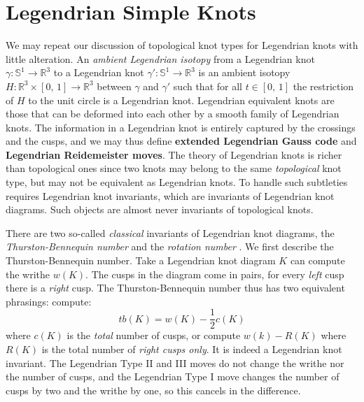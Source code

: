 \section{Legendrian Simple Knots}
    We may repeat our discussion of topological knot types for Legendrian
    knots with little alteration. An \textit{ambient Legendrian isotopy} from
    a Legendrian knot $\gamma:\mathbb{S}^{1}\rightarrow\mathbb{R}^{3}$ to a
    Legendrian knot $\gamma':\mathbb{S}^{1}\rightarrow\mathbb{R}^{3}$ is an
    ambient isotopy $H:\mathbb{R}^{3}\times[0,\,1]\rightarrow\mathbb{R}^{3}$
    between $\gamma$ and $\gamma'$ such that for all $t\in[0,\,1]$ the
    restriction of $H$ to the unit circle is a Legendrian knot. Legendrian
    equivalent knots are those that can be deformed into each other by a
    smooth family of Legendrian knots. The information in a Legendrian knot is
    entirely captured by the crossings and the cusps, and we may thus define
    \textbf{extended Legendrian Gauss code} and
    \textbf{Legendrian Reidemeister moves}. The theory of Legendrian knots is
    richer than topological ones since two knots may belong to the same
    \textit{topological} knot type, but may not be equivalent as Legendrian
    knots. To handle such subtleties requires Legendrian knot invariants, which
    are invariants of Legendrian knot diagrams. Such objects are almost never
    invariants of topological knots.
    \par\hfill\par
    There are two so-called \textit{classical} invariants of Legendrian knot
    diagrams, the \textit{Thurston-Bennequin number} and the
    \textit{rotation number} \cite{Ding2006LEGENDRIANHA}. We first describe the
    Thurston-Bennequin number. Take a Legendrian knot diagram $K$ can compute
    the writhe $w(K)$. The
    cusps in the diagram come in pairs, for every \textit{left} cusp there is
    a \textit{right} cusp. The Thurston-Bennequin number thus has two
    equivalent phrasings: compute:
    \begin{equation}
        tb(K)=w(K)-\frac{1}{2}c(K)
    \end{equation}
    where $c(K)$ is the \textit{total} number of cusps, or compute
    $w(k)-R(K)$ where $R(K)$ is the total number of \textit{right cusps only}.
    It is indeed a Legendrian knot invariant. The Legendrian Type II and III
    moves do not change the writhe nor the number of cusps, and the Legendrian
    Type I move changes the number of cusps by two and the writhe by one, so
    this cancels in the difference.
    \par\hfill\par

